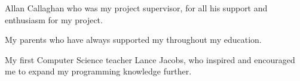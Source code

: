 Allan Callaghan who was my project supervisor, for all his support and enthusiasm for my project.

My parents who have always supported my throughout my education.

My first Computer Science teacher Lance Jacobs, who inspired and encouraged me to expand my programming knowledge further.
